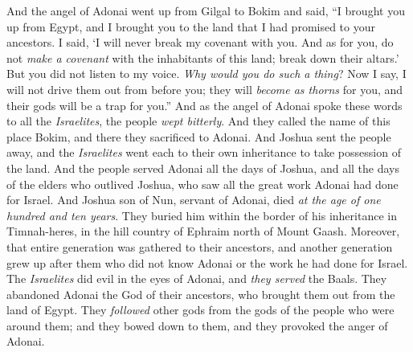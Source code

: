 \begin{biblechapter} %
 And the angel of Adonai went up from Gilgal to Bokim and said, “I brought you up from Egypt, and I brought you to the land that I had promised to your ancestors. I said, ‘I will never break my covenant with you.
\verse And as for you, do not \textit{make a covenant} with the inhabitants of this land; break down their altars.’ But you did not listen to my voice. \textit{Why would you do such a thing}?
\verse Now I say, I will not drive them out from before you; they will \textit{become as thorns} for you, and their gods will be a trap for you.”
\verse And as the angel of Adonai spoke these words to all the \textit{Israelites}, the people \textit{wept bitterly}.
\verse And they called the name of this place Bokim, and there they sacrificed to Adonai.
 And Joshua sent the people away, and the \textit{Israelites} went each to their own inheritance to take possession of the land.
\verse And the people served Adonai all the days of Joshua, and all the days of the elders who outlived Joshua, who saw all the great work Adonai had done for Israel.
\verse And Joshua son of Nun, servant of Adonai, died \textit{at the age of one hundred and ten years}.
\verse They buried him within the border of his inheritance in Timnah-heres, in the hill country of Ephraim north of Mount Gaash.
\verse Moreover, that entire generation was gathered to their ancestors, and another generation grew up after them who did not know Adonai or the work he had done for Israel.
 The \textit{Israelites} did evil in the eyes of Adonai, and \textit{they served} the Baals.
\verse They abandoned Adonai the God of their ancestors, who brought them out from the land of Egypt. They \textit{followed} other gods from the gods of the people who were around them; and they bowed down to them, and they provoked the anger of Adonai.

\end{biblechapter}
